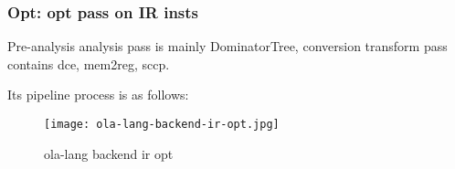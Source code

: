 \subsubsection{Opt: opt pass on IR insts}

Pre-analysis analysis pass is mainly DominatorTree, conversion transform pass contains dce, mem2reg, sccp.

Its pipeline process is as follows:
\begin{figure}[!htbp]
    \centering
    \texttt{[image: ola-lang-backend-ir-opt.jpg]}
    \caption{ola-lang backend ir opt}
    \label{fig:ola-lang-backend-ir-opt}
\end{figure}